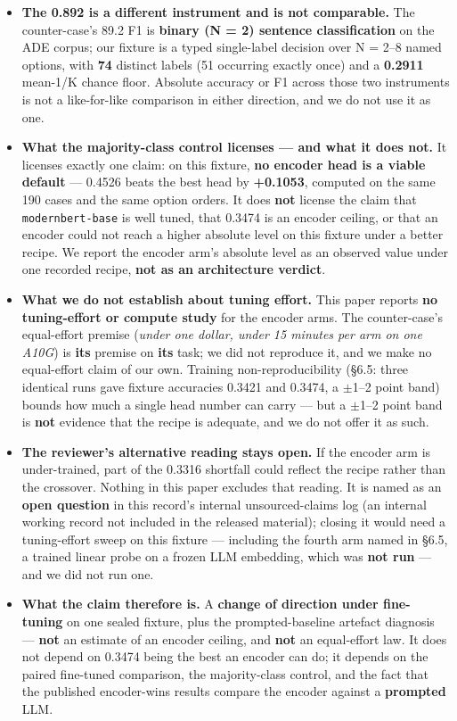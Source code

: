 \documentclass[11pt,a4paper]{article}
\begin{document}
\begin{itemize}
\item \textbf{The 0.892 is a different instrument and is not comparable.} The counter-case's 89.2 F1 is \textbf{binary (N = 2) sentence classification} on the ADE corpus; our fixture is a typed single-label decision over N = 2--8 named options, with \textbf{74} distinct labels (51 occurring exactly once) and a \textbf{0.2911} mean-1/K chance floor. Absolute accuracy or F1 across those two instruments is not a like-for-like comparison in either direction, and we do not use it as one.
\item \textbf{What the majority-class control licenses --- and what it does not.} It licenses exactly one claim: on this fixture, \textbf{no encoder head is a viable default} --- 0.4526 beats the best head by \textbf{+0.1053}, computed on the same 190 cases and the same option orders. It does \textbf{not} license the claim that \texttt{modernbert-base} is well tuned, that 0.3474 is an encoder ceiling, or that an encoder could not reach a higher absolute level on this fixture under a better recipe. We report the encoder arm's absolute level as an observed value under one recorded recipe, \textbf{not as an architecture verdict}.
\item \textbf{What we do not establish about tuning effort.} This paper reports \textbf{no tuning-effort or compute study} for the encoder arms. The counter-case's equal-effort premise (\emph{under one dollar, under 15 minutes per arm on one A10G}) is \textbf{its} premise on \textbf{its} task; we did not reproduce it, and we make no equal-effort claim of our own. Training non-reproducibility (\S6.5: three identical runs gave fixture accuracies 0.3421 and 0.3474, a $\pm$1--2 point band) bounds how much a single head number can carry --- but a $\pm$1--2 point band is \textbf{not} evidence that the recipe is adequate, and we do not offer it as such.
\item \textbf{The reviewer's alternative reading stays open.} If the encoder arm is under-trained, part of the 0.3316 shortfall could reflect the recipe rather than the crossover. Nothing in this paper excludes that reading. It is named as an \textbf{open question} in this record's internal unsourced-claims log (an internal working record not included in the released material); closing it would need a tuning-effort sweep on this fixture --- including the fourth arm named in \S6.5, a trained linear probe on a frozen LLM embedding, which was \textbf{not run} --- and we did not run one.
\item \textbf{What the claim therefore is.} A \textbf{change of direction under fine-tuning} on one sealed fixture, plus the prompted-baseline artefact diagnosis --- \textbf{not} an estimate of an encoder ceiling, and \textbf{not} an equal-effort law. It does not depend on 0.3474 being the best an encoder can do; it depends on the paired fine-tuned comparison, the majority-class control, and the fact that the published encoder-wins results compare the encoder against a \textbf{prompted} LLM.
\end{itemize}
\end{document}
